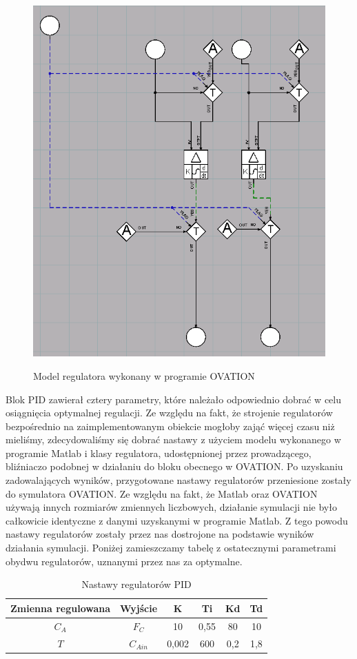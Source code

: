 \begin{figure}[h!]
	\centering
	\includegraphics[width=.6\linewidth]{img/PID.png}
	\label{ch2:regulator}
	\caption{Model regulatora wykonany w programie OVATION}
\end{figure}
\newpage
Blok PID zawierał cztery parametry, które należało odpowiednio dobrać w celu osiągnięcia optymalnej regulacji. Ze względu na fakt, że strojenie regulatorów bezpośrednio na zaimplementowanym obiekcie mogłoby zająć więcej czasu niż mieliśmy, zdecydowaliśmy się dobrać nastawy z użyciem modelu wykonanego w programie Matlab i klasy regulatora, udostępnionej przez prowadzącego, bliźniaczo podobnej w działaniu do bloku obecnego w OVATION. Po uzyskaniu zadowalających wyników, przygotowane nastawy regulatorów przeniesione zostały do symulatora OVATION. Ze względu na fakt, że Matlab oraz OVATION używają innych rozmiarów zmiennych liczbowych, działanie symulacji nie było całkowicie identyczne z danymi uzyskanymi w programie Matlab. Z tego powodu nastawy regulatorów zostały przez nas dostrojone na podstawie wyników działania symulacji. Poniżej zamieszczamy tabelę z ostatecznymi parametrami obydwu regulatorów, uznanymi przez nas za optymalne.

\begin{table}[h!]
	\centering
	\begin{tabular}{|c|c|c|c|c|c|}
		\hline
		Zmienna regulowana&Wyjście&K&Ti&Kd&Td\\\hline
		$C_A$&$F_C$&10&0,55&80&10\\\hline
		$T$&$C_{Ain}$&0,002&600&0,2&1,8\\\hline
	\end{tabular}
\label{tab:pid}
\caption{Nastawy regulatorów PID}
\end{table}


